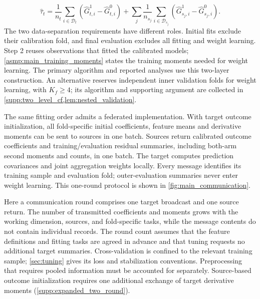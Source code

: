 \documentclass[12pt]{article}
\begin{document}
\begin{equation}\label{eq:main_complete_tate}
\widehat\tau_t
=\frac1{n_t}\sum_{i\in\mathcal D_t}(\widehat G_{t,i}^1-\widehat G_{t,i}^0)
 +\sum_j\frac1{n_{s_j}}\sum_{i\in\mathcal D_{s_j}}
                    (\widehat G_{s_j,i}^1-\widehat G_{s_j,i}^0).
\end{equation}
The two data-separation requirements have different roles. Initial fits exclude their calibration fold, and final evaluation excludes all fitting and weight learning. Step 2 reuses observations that fitted the calibrated models; \cref{asmp:main_training_moments} states the training moments needed for weight learning. The primary algorithm and reported analyses use this two-layer construction. An alternative reserves independent inner validation folds for weight learning, with $K_f\ge4$; its algorithm and supporting argument are collected in \cref{supp:two_level_cf,lem:nested_validation}.

The same fitting order admits a federated implementation. With target outcome initialization, all fold-specific initial coefficients, feature means and derivative moments can be sent to sources in one batch. Sources return calibrated outcome coefficients and training/evaluation residual summaries, including both-arm second moments and counts, in one batch. The target computes prediction covariances and joint aggregation weights locally. Every message identifies its training sample and evaluation fold; outer-evaluation summaries never enter weight learning. This one-round protocol is shown in \cref{fig:main_communication}.

Here a communication round comprises one target broadcast and one source return. The number of transmitted coefficients and moments grows with the working dimension, sources, and fold-specific tasks, while the message contents do not contain individual records. The round count assumes that the feature definitions and fitting tasks are agreed in advance and that tuning requests no additional target summaries. Cross-validation is confined to the relevant training sample; \cref{sec:tuning} gives its loss and stabilization conventions. Preprocessing that requires pooled information must be accounted for separately. Source-based outcome initialization requires one additional exchange of target derivative moments (\cref{supp:expanded_two_round}).
\end{document}
